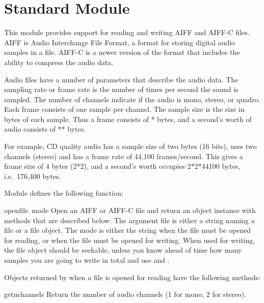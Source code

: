 \section{Standard Module }
\label{module-aifc}

This module provides support for reading and writing AIFF and AIFF-C
files.  AIFF is Audio Interchange File Format, a format for storing
digital audio samples in a file.  AIFF-C is a newer version of the
format that includes the ability to compress the audio data.

Audio files have a number of parameters that describe the audio data.
The sampling rate or frame rate is the number of times per second the
sound is sampled.  The number of channels indicate if the audio is
mono, stereo, or quadro.  Each frame consists of one sample per
channel.  The sample size is the size in bytes of each sample.  Thus a
frame consists of * bytes, and a
second's worth of audio consists of
** bytes.

For example, CD quality audio has a sample size of two bytes (16
bits), uses two channels (stereo) and has a frame rate of 44,100
frames/second.  This gives a frame size of 4 bytes (2*2), and a
second's worth occupies 2*2*44100 bytes, i.e.\ 176,400 bytes.

Module  defines the following function:

\begin{funcdesc}{open}{file\, mode}
Open an AIFF or AIFF-C file and return an object instance with
methods that are described below.  The argument file is either a
string naming a file or a file object.  The mode is either the string
 when the file must be opened for reading, or 
when the file must be opened for writing.  When used for writing, the
file object should be seekable, unless you know ahead of time how many
samples you are going to write in total and use
 and .
\end{funcdesc}

Objects returned by  when a file is opened for
reading have the following methods:

\begin{funcdesc}{getnchannels}{}
Return the number of audio channels (1 for mono, 2 for stereo).
\end{funcdesc}

